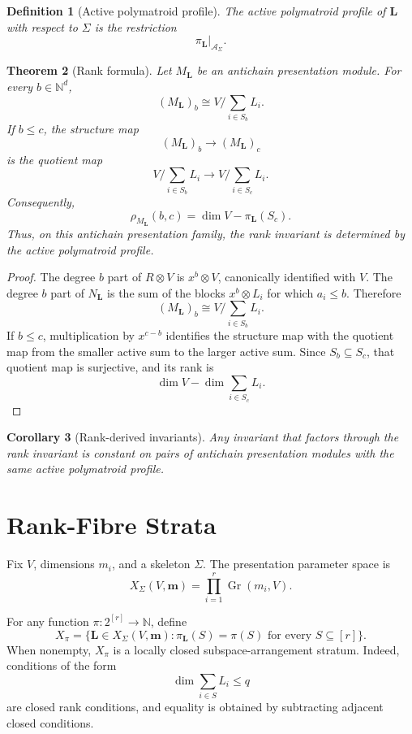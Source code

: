 \documentclass[11pt]{article}
\newtheorem{theorem}{Theorem}[section]
\newtheorem{corollary}[theorem]{Corollary}
\newtheorem{definition}[theorem]{Definition}
\begin{document}
\begin{definition}[Active polymatroid profile]
The active polymatroid profile of \(\mathbf L\) with respect to \(\Sigma\) is the restriction
\[
\pi_{\mathbf L}\vert_{\mathcal A_\Sigma}.
\]
\end{definition}

\begin{theorem}[Rank formula]
Let \(M_{\mathbf L}\) be an antichain presentation module. For every \(b\in\mathbb N^d\),
\[
(M_{\mathbf L})_b
\cong
V\Big/\sum_{i\in S_b}L_i.
\]
If \(b\le c\), the structure map
\[
(M_{\mathbf L})_b\to (M_{\mathbf L})_c
\]
is the quotient map
\[
V/\sum_{i\in S_b}L_i
\longrightarrow
V/\sum_{i\in S_c}L_i.
\]
Consequently,
\[
\rho_{M_{\mathbf L}}(b,c)
=
\dim V-\pi_{\mathbf L}(S_c).
\]
Thus, on this antichain presentation family, the rank invariant is determined by the active polymatroid profile.
\end{theorem}

\begin{proof}
The degree \(b\) part of \(R\otimes V\) is \(x^b\otimes V\), canonically identified with \(V\). The degree \(b\) part of \(N_{\mathbf L}\) is the sum of the blocks \(x^b\otimes L_i\) for which \(a_i\le b\). Therefore
\[
(M_{\mathbf L})_b
\cong
V/\sum_{i\in S_b}L_i.
\]
If \(b\le c\), multiplication by \(x^{c-b}\) identifies the structure map with the quotient map from the smaller active sum to the larger active sum. Since \(S_b\subseteq S_c\), that quotient map is surjective, and its rank is
\[
\dim V-\dim\sum_{i\in S_c}L_i.
\]
\end{proof}

\begin{corollary}[Rank-derived invariants]
Any invariant that factors through the rank invariant is constant on pairs of antichain presentation modules with the same active polymatroid profile.
\end{corollary}

\section{Rank-Fibre Strata}

Fix \(V\), dimensions \(m_i\), and a skeleton \(\Sigma\). The presentation parameter space is
\[
X_\Sigma(V,\mathbf m)
=
\prod_{i=1}^r\operatorname{Gr}(m_i,V).
\]

For any function \(\pi:2^{[r]}\to\mathbb N\), define
\[
X_\pi
=
\{\mathbf L\in X_\Sigma(V,\mathbf m):
\pi_{\mathbf L}(S)=\pi(S)\text{ for every }S\subseteq[r]\}.
\]
When nonempty, \(X_\pi\) is a locally closed subspace-arrangement stratum. Indeed, conditions of the form
\[
\dim\sum_{i\in S}L_i\le q
\]
are closed rank conditions, and equality is obtained by subtracting adjacent closed conditions.
\end{document}
